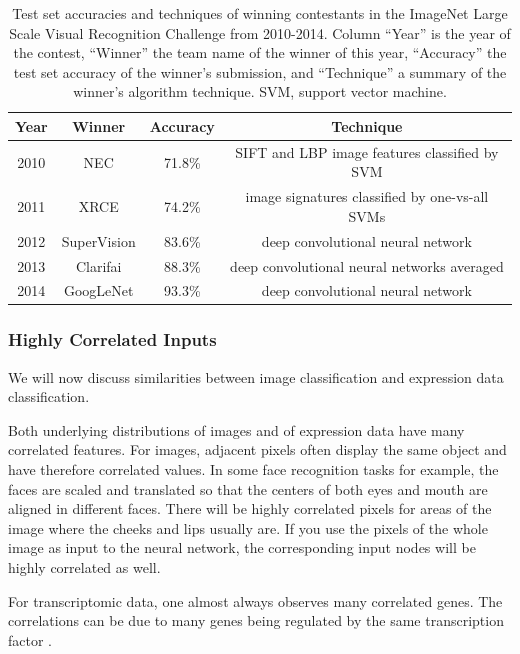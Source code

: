 \begin{table}
\begin{centering}
\begin{tabular}{|c|c|c|c|}
\hline 
Year & Winner & Accuracy & Technique\tabularnewline
\hline 
\hline 
2010 & NEC & 71.8\% & SIFT and LBP image features classified by SVM\tabularnewline
\hline 
2011 & XRCE & 74.2\% & image signatures classified by one-vs-all SVMs\tabularnewline
\hline 
2012 & SuperVision & 83.6\% & deep convolutional neural network\tabularnewline
\hline 
2013 & Clarifai & 88.3\% & deep convolutional neural networks averaged\tabularnewline
\hline 
2014 & GoogLeNet & 93.3\% & deep convolutional neural network\tabularnewline
\hline 
\end{tabular}
\par\end{centering}
\caption[Test set accuracies and techniques of winning contestants in the ImageNet
Large Scale Visual Recognition Challenge from 2010-2014.]{\label{tab:ILSVRC-Test-set-accuracies}Test set accuracies and techniques
of winning contestants in the ImageNet Large Scale Visual Recognition
Challenge from 2010-2014. Column ``Year'' is the year of the contest,
``Winner'' the team name of the winner of this year, ``Accuracy''
the test set accuracy of the winner's submission, and ``Technique''
a summary of the winner's algorithm technique. SVM, support vector
machine.}
\end{table}

\subsubsection{Highly Correlated Inputs}

We will now discuss similarities between image classification and
expression data classification.

Both underlying distributions \textendash{} of images and of expression
data \textendash{} have many correlated features. For images, adjacent
pixels often display the same object and have therefore correlated
values. In some face recognition tasks for example, the faces are
scaled and translated so that the centers of both eyes and mouth are
aligned in different faces. There will be highly correlated pixels
for areas of the image where the cheeks and lips usually are. If you
use the pixels of the whole image as input to the neural network,
the corresponding input nodes will be highly correlated as well.

For transcriptomic data, one almost always observes many correlated
genes. The correlations can be due to many genes being regulated by
the same transcription factor \cite{TornowMewes2003,KlebanovYakovlev2007}.

